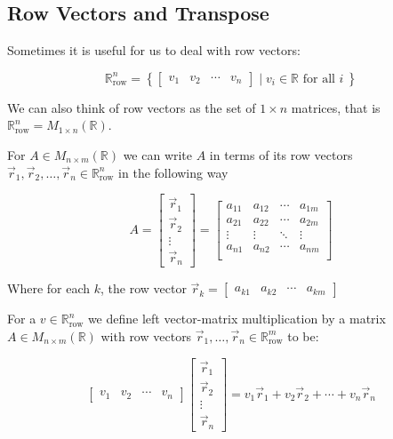 

\clearpage

\subsection{Row Vectors and Transpose}

Sometimes it is useful for us to deal with row vectors:

$$
\mathbb{R}_\text{row}^n=\left\{ 
\begin{bmatrix}v_1 & v_2 & \cdots & v_n\end{bmatrix}
\mid v_i \in \mathbb{R} \text{ for all } i\ \right\}
$$

We can also think of row vectors as the set of $1 \times n $ matrices, that is $\mathbb{R}^n_\text{row} = M_{1 \times n}(\mathbb{R})$.

For $A \in  M_{n \times m}(\mathbb{R})$ we can write $A$ in terms of its row vectors $\vec{r}_1, \vec{r}_2, \ldots, \vec{r}_n \in \mathbb{R}^n_\text{row}$ in the 
following way

$$
A=\begin{bmatrix}\vec{r}_1 \\ \vec{r}_2 \\ \vdots \\ \vec{r}_n \end{bmatrix}=
\begin{bmatrix}
a_{11} & a_{12} & \cdots & a_{1m} \\
a_{21} & a_{22} & \cdots & a_{2m} \\
\vdots & \vdots & \ddots & \vdots \\
a_{n1} & a_{n2} & \cdots & a_{nm} \\
\end{bmatrix}
$$

Where for each $k$, the row vector $\vec{r}_k=\begin{bmatrix}a_{k1} & a_{k2} & \cdots & a_{km}\end{bmatrix}$

For a $v \in \mathbb{R}_\text{row}^n$ we define left vector-matrix multiplication by a matrix $A\in M_{n \times m}(\mathbb{R})$ with row vectors 
$\vec{r}_1, \ldots, \vec{r}_n \in \mathbb{R}^m_\text{row}$ to be:


$$
\begin{bmatrix}v_1 & v_2 & \cdots & v_n\end{bmatrix}\begin{bmatrix}\vec{r}_1 \\ \vec{r}_2 \\ \vdots \\ \vec{r}_n\end{bmatrix}
=v_1\vec{r}_1+v_2\vec{r}_2+ \cdots + v_n\vec{r}_n 
$$

